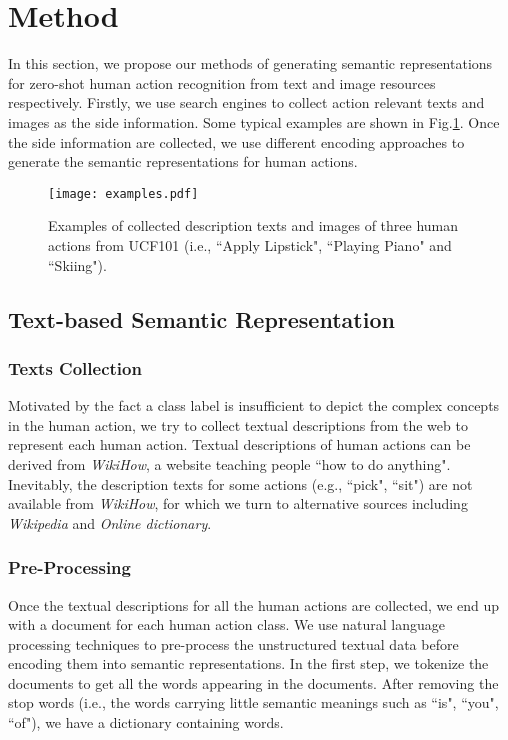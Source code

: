 \documentclass[runningheads,a4paper] {llncs}
\begin{document}
\section{Method}
\label{method}
In this section, we propose our methods of generating semantic representations for zero-shot human action recognition from text and image resources respectively. Firstly, we use search engines to collect action relevant texts and images as the side information. Some typical examples are shown in Fig.\ref{fig_examples}. Once the side information are collected, we use different encoding approaches to generate the semantic representations for human actions.
\begin{figure}
\texttt{[image: examples.pdf]}
\caption{Examples of collected description texts and images of three human actions from UCF101 (i.e., ``Apply Lipstick", ``Playing Piano" and ``Skiing").}
\label{fig_examples}
\end{figure}
\subsection{Text-based Semantic Representation}
\label{sect_texts}
\subsubsection{Texts Collection}
Motivated by the fact a class label is insufficient to depict the complex concepts in the human action, we try to collect textual descriptions from the web to represent each human action. Textual descriptions of human actions can be derived from \textit{WikiHow}, a website teaching people ``how to do anything". Inevitably, the description texts for some actions (e.g., ``pick", ``sit") are not available from \textit{WikiHow}, for which we turn to alternative sources including \textit{Wikipedia} and \textit{Online dictionary}. 

\subsubsection{Pre-Processing}
Once the textual descriptions for all the human actions are collected, we end up with a document for each human action class. We use natural language processing techniques to pre-process the unstructured textual data before encoding them into semantic representations. In the first step, we tokenize the documents to get all the words appearing in the documents. After removing the stop words (i.e., the words carrying little semantic meanings such as ``is", ``you", ``of"), we have a dictionary containing  words.
\end{document}
